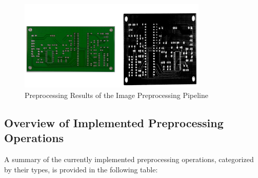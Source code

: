 \documentclass[journal]{new-aiaa}
\begin{document}
\begin{figure}[h]
	\centering
	\includegraphics[width=0.8\textwidth]{preprocessing_results.png}
	\caption{Preprocessing Results of the Image Preprocessing Pipeline}
	\label{fig:preprocessing_results}
\end{figure}

\subsection{Overview of Implemented Preprocessing Operations}
A summary of the currently implemented preprocessing operations, categorized by their types, is provided in the following table:
\end{document}
